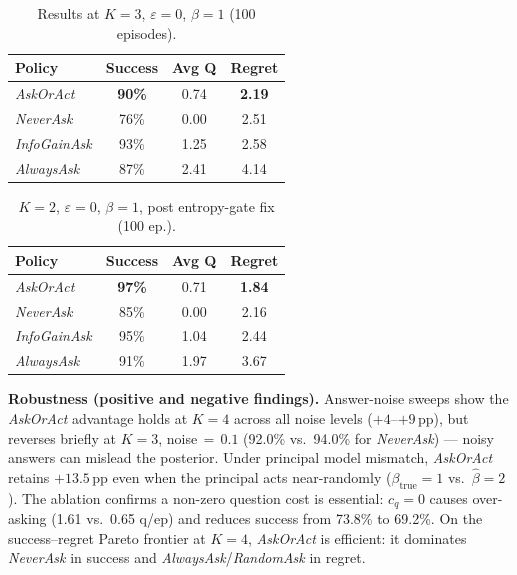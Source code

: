\documentclass[10pt,twocolumn]{article}
\begin{document}
\begin{table}[h]
  \centering\small
  \caption{Results at $K{=}3$, $\varepsilon{=}0$, $\beta{=}1$ (100 episodes).}
  \label{tab:k3}
  \begin{tabular}{lccc}
    \toprule
    Policy & Success & Avg Q & Regret \\
    \midrule
    \textit{AskOrAct}    & \textbf{90\%} & 0.74 & \textbf{2.19} \\
    \textit{NeverAsk}    & 76\%          & 0.00 & 2.51 \\
    \textit{InfoGainAsk} & 93\%          & 1.25 & 2.58 \\
    \textit{AlwaysAsk}   & 87\%          & 2.41 & 4.14 \\
    \bottomrule
  \end{tabular}
\end{table}

\begin{table}[h]
  \centering\small
  \caption{$K{=}2$, $\varepsilon{=}0$, $\beta{=}1$, post entropy-gate fix (100 ep.).}
  \label{tab:k2}
  \begin{tabular}{lccc}
    \toprule
    Policy & Success & Avg Q & Regret \\
    \midrule
    \textit{AskOrAct}    & \textbf{97\%} & 0.71 & \textbf{1.84} \\
    \textit{NeverAsk}    & 85\%          & 0.00 & 2.16 \\
    \textit{InfoGainAsk} & 95\%          & 1.04 & 2.44 \\
    \textit{AlwaysAsk}   & 91\%          & 1.97 & 3.67 \\
    \bottomrule
  \end{tabular}
\end{table}

\textbf{Robustness (positive and negative findings).}
Answer-noise sweeps show the \textit{AskOrAct} advantage holds at $K{=}4$ across all noise levels ($+4$--$+9$\,pp), but reverses briefly at $K{=}3$, noise$\,{=}\,0.1$ (92.0\% vs.\ 94.0\% for \textit{NeverAsk}) — noisy answers can mislead the posterior.
Under principal model mismatch, \textit{AskOrAct} retains $+13.5$\,pp even when the principal acts near-randomly ($\beta_{\text{true}}{=}1$ vs.\ $\hat\beta{=}2$).
The ablation confirms a non-zero question cost is essential: $c_q{=}0$ causes over-asking (1.61 vs.\ 0.65 q/ep) and reduces success from 73.8\% to 69.2\%.
On the success--regret Pareto frontier at $K{=}4$, \textit{AskOrAct} is efficient: it dominates \textit{NeverAsk} in success and \textit{AlwaysAsk}/\textit{RandomAsk} in regret.
\end{document}

